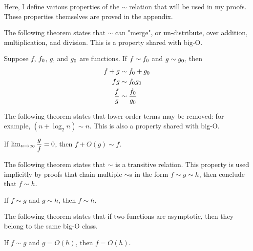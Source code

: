 Here, I define various properties of the $\sim$ relation that will be used in my proofs. These properties themselves are proved in the appendix.

The following theorem states that $\sim$ can "merge", or un-distribute, over addition, multiplication, and division. This is a property shared with big-O.

\begin{theorem}
\label{thm:MergesOverOps}
	Suppose $f$, $f_0$, $g$, and $g_0$ are functions. If $f \sim f_0$ and $g \sim g_0$, then
	\begin{align*}
	f + g &\sim f_0 + g_0\\
	fg &\sim f_0g_0\\
	\frac{f}{g} &\sim \frac {f_0} {g_0}
	\end{align*}
\end{theorem}

The following theorem states that lower-order terms may be removed: for example, $(n + \log_2 n) \sim n$. This is also a property shared with big-O.

\begin{theorem}
\label{thm:RemovesLowerOrderTerms}
	If $\lim_{n \to \infty} \dfrac{g}{f} = 0$, then $f + O(g) \sim f$.
\end{theorem}

The following theorem states that $\sim$ is a transitive relation. This property is used implicitly by proofs that chain multiple $\sim$s in the form $f \sim g \sim h$, then conclude that $f \sim h$.

\begin{theorem}
\label{thm:Transitivity}
	If $f \sim g$ and $g \sim h$, then $f \sim h$.
\end{theorem}

The following theorem states that if two functions are asymptotic, then they belong to the same big-O class.

\begin{theorem}
\label{thm:SameBigOClass}
	If $f \sim g$ and $g = O(h)$, then $f = O(h)$.
\end{theorem}